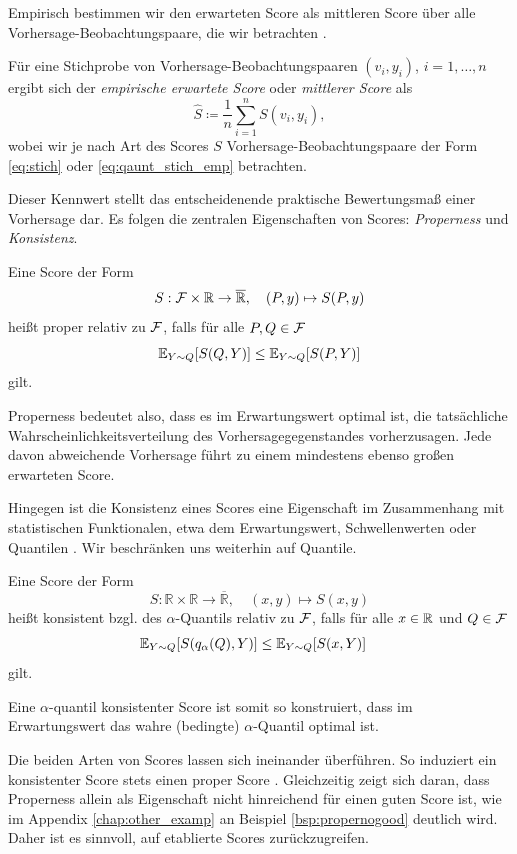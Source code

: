 Empirisch bestimmen wir den erwarteten Score als mittleren Score über alle Vorhersage-Beobachtungspaare, die wir betrachten \parencite{gneiting2014probabilistic}.
\begin{defi}\label{def:emp_exp_score}
Für eine Stichprobe von Vorhersage-Beobachtungspaaren
$(v_i,y_i)$, $i=1,\dotsc,n$ ergibt sich der \emph{empirische erwartete Score} oder \emph{mittlerer Score}  als
\[
\hat S\coloneqq \frac1n\sum_{i=1}^n S(v_i,y_i),
\]
wobei wir je nach Art des Scores $S$ Vorhersage-Beobachtungspaare der Form \ref{eq:stich} oder \ref{eq:qaunt_stich_emp} betrachten.
\end{defi}{}
\noindent
Dieser Kennwert stellt das entscheidenende praktische Bewertungsmaß einer Vorhersage dar. Es folgen die zentralen Eigenschaften von Scores: \emph{Properness} und \emph{Konsistenz}.
\begin{defi}
Eine Score der Form 
\[S: \mathcal{F} \times \mathbb{R} \to \overline{\mathbb{R}},\quad (P,y) \mapsto S(P,y)\] heißt proper relativ zu $\mathcal{F}$, falls für alle $P,Q \in \mathcal{F}$
\[
\mathbb{E}_{Y\sim Q}[S(Q,Y)]\leq \mathbb{E}_{Y\sim Q}[S(P,Y)]
\]
gilt.
\end{defi}

Properness bedeutet also, dass es im Erwartungswert optimal ist, die tatsächliche Wahrscheinlichkeitsverteilung des Vorhersagegegenstandes vorherzusagen. Jede davon abweichende Vorhersage führt zu einem mindestens ebenso großen erwarteten Score.

Hingegen ist die Konsistenz eines Scores eine Eigenschaft im Zusammenhang mit statistischen Funktionalen, etwa dem Erwartungswert, Schwellenwerten oder Quantilen \parencite[Definition 5]{gneiting2014probabilistic}. Wir beschränken uns weiterhin auf Quantile.

\begin{defi}
\label{def::consistent}
Eine Score der Form \[S: \mathbb{R} \times \mathbb{R} \to \overline{\mathbb{R}},\quad (x,y) \mapsto S(x,y)\] heißt konsistent bzgl. des $\alpha$-Quantils relativ zu $\mathcal{F}$, falls für alle $x \in \mathbb{R}$ und $Q \in \mathcal{F}$ 
\[
\mathbb{E}_{Y\sim Q}[S(q_\alpha(Q),Y)]\leq \mathbb{E}_{Y\sim Q}[S(x,Y)]\quad 
\]
gilt.
\end{defi}
Eine $\alpha$-quantil konsistenter Score ist somit so konstruiert, dass im Erwartungswert das wahre (bedingte) $\alpha$-Quantil optimal ist.

Die beiden Arten von Scores lassen sich ineinander überführen. So induziert ein konsistenter Score stets einen proper Score \parencite[Theorem 3]{gneitingMakingPoint2011}. Gleichzeitig zeigt sich daran, dass Properness allein als Eigenschaft nicht hinreichend für einen guten Score ist, wie im Appendix \ref{chap:other_examp} an Beispiel \ref{bsp:propernogood} deutlich wird. Daher ist es sinnvoll, auf etablierte Scores zurückzugreifen.

